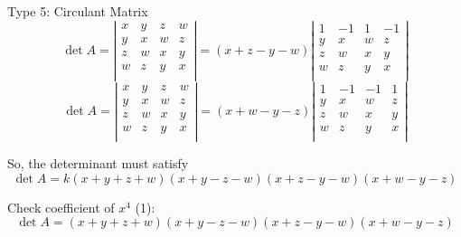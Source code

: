 \documentclass{beamer}
\begin{document}
\begin{frame}{Type 5: Circulant Matrix}
\begin{equation*}
    \det A=\left| \begin{matrix}
        x&		y&		z&		w\\
        y&		x&		w&		z\\
        z&		w&		x&		y\\
        w&		z&		y&		x\\
    \end{matrix} \right|=\left( x+z-y-w \right) \left| \begin{matrix}
        1&		-1&		1&		-1\\
        y&		x&		w&		z\\
        z&		w&		x&		y\\
        w&		z&		y&		x\\
    \end{matrix} \right|
\end{equation*}
\begin{equation*}
    \det A=\left| \begin{matrix}
        x&		y&		z&		w\\
        y&		x&		w&		z\\
        z&		w&		x&		y\\
        w&		z&		y&		x\\
    \end{matrix} \right|=\left( x+w-y-z \right) \left| \begin{matrix}
        1&		-1&		-1&		1\\
        y&		x&		w&		z\\
        z&		w&		x&		y\\
        w&		z&		y&		x\\
    \end{matrix} \right|
\end{equation*}

So, the determinant must satisfy
\begin{equation*}
    \det A=k\left( x+y+z+w \right) \left( x+y-z-w \right) \left( x+z-y-w \right) \left( x+w-y-z \right)
\end{equation*}

Check coefficient of $x^4$ (1):
\begin{equation*}
    \det A=\left( x+y+z+w \right) \left( x+y-z-w \right) \left( x+z-y-w \right) \left( x+w-y-z \right)
\end{equation*}
\end{frame}
\end{document}
